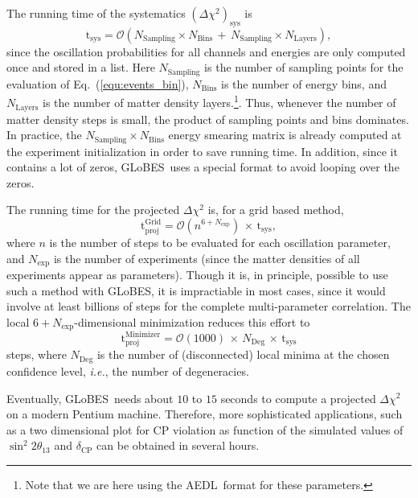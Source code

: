 \documentclass[12pt,a4paper]{article}
\newcommand{\ie}{{\it i.e.}}
\newcommand{\eq}{Eq.}
\newcommand{\deltacp}{\delta_{\mathrm{CP}}}
\newcommand{\stheta}{\sin^2 2 \theta_{13}}
\newcommand{\GLOBES}{{\sf GLoBES}}
\newcommand{\AEDL}{{\sf AEDL}}
\newcommand{\equ}[1]{\eq~(\ref{equ:#1})}
\begin{document}
The running time of the systematics $(\Delta \chi^2)_{\mathrm{sys}}$ 
is 
\begin{equation}
\mathrm{t_{sys}} = \mathcal{O} \left( N_{\mathrm{Sampling}} \times N_{\mathrm{Bins}}  \, + \, N_{\mathrm{Sampling}} \times N_{\mathrm{Layers}} \right) ,
\end{equation}
since the oscillation probabilities for all channels and energies
are only computed once and stored in a list. Here $N_{\mathrm{Sampling}}$ is the number of sampling points for the evaluation of \equ{events_bin}, $N_{\mathrm{Bins}}$ is the number of energy bins,
and $N_{\mathrm{Layers}}$ is the number of matter density layers.\footnote{Note that we are here using the \AEDL\ format for these
parameters.}. Thus, whenever the
number of matter density steps is small, the product of sampling points
and bins dominates. In practice, the $N_{\mathrm{Sampling}} \times N_{\mathrm{Bins}}$ energy smearing matrix is already computed at 
the experiment initialization in order to save running time. In addition,
since it contains a lot of zeros, \GLOBES\ uses a special format to
avoid looping over the zeros.

The running time for the projected $\Delta \chi^2$ is, for a grid based method,
\begin{equation}
 \mathrm{t_{proj}^{Grid}} = \mathcal{O}\left( n^{6+N_{\mathrm{exp}}}\right) \, \times \, \mathrm{t_{sys}},
\end{equation}
where $n$ is the number of steps to be evaluated for each oscillation
parameter, and $N_{\mathrm{exp}}$ is the number of experiments
(since the matter densities of all experiments appear as parameters). 
Though it is, in principle, possible to use such a method with \GLOBES ,
it is impractiable in most cases, since it would involve at least 
billions of
steps for the complete multi-parameter correlation. The local $6+N_{\mathrm{exp}}$-dimensional minimization reduces this effort
to 
\begin{equation}
\mathrm{t_{proj}^{Minimizer}} = \mathcal{O}(1000) \, \times \,
N_{\mathrm{Deg}} \,  \times \, \mathrm{t_{sys}}
\end{equation}
steps, where $N_{\mathrm{Deg}}$ is the number of (disconnected) 
local minima at the chosen confidence level, \ie, the number of
degeneracies.

Eventually, \GLOBES\ needs about $10$ to $15$ seconds to compute
a projected $\Delta \chi^2$ on a modern Pentium machine. Therefore,
more sophisticated applications, such as a two dimensional plot
for CP violation as function of the simulated values of $\stheta$ and
$\deltacp$ can be obtained in several hours.
\end{document}
